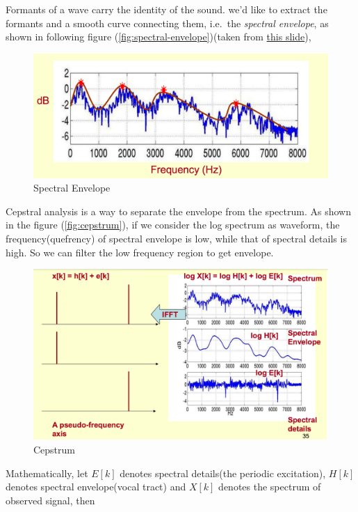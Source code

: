 \documentclass[]{article}
\begin{document}
Formants of a wave carry the identity of the sound. we'd like to extract
the formants and a smooth curve connecting them, i.e.~the \emph{spectral
envelope}, as shown in following figure
(\autoref{fig:spectral-envelope})(taken from
\href{http://www.speech.cs.cmu.edu/11-492/slides/03_mfcc.pdf}{this
slide}),

\begin{figure}[h]\centering\includegraphics[width=\textwidth]{source//images/posts/spectral-envelope.png}\caption{Spectral Envelope}\label{fig:spectral-envelope}\end{figure}

Cepstral analysis is a way to separate the envelope from the spectrum.
As shown in the figure (\autoref{fig:cepstrum}), if we consider the log
spectrum as waveform, the frequency(quefrency) of spectral envelope is
low, while that of spectral details is high. So we can filter the low
frequency region to get envelope.

\begin{figure}[h]\centering\includegraphics[width=\textwidth]{source//images/posts/cepstrum.png}\caption{Cepstrum}\label{fig:cepstrum}\end{figure}

Mathematically, let \(E[k]\) denotes spectral details(the periodic
excitation), \(H[k]\) denotes spectral envelope(vocal tract) and
\(X[k]\) denotes the spectrum of observed signal, then
\end{document}
